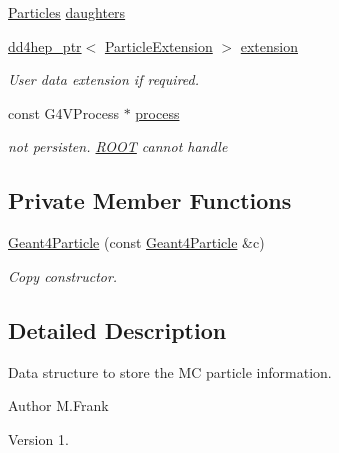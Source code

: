 \begin{DoxyCompactItemize}
\hyperlink{class_d_d4hep_1_1_simulation_1_1_geant4_particle_a123ad778eff51ea80ce778d54776c072}{Particles} \hyperlink{class_d_d4hep_1_1_simulation_1_1_geant4_particle_a2d11cd13a703d52fa61142af97e243cb}{daughters}
\item 
\hyperlink{class_d_d4hep_1_1dd4hep__ptr}{dd4hep\+\_\+ptr}$<$ \hyperlink{class_d_d4hep_1_1_simulation_1_1_particle_extension}{Particle\+Extension} $>$ \hyperlink{class_d_d4hep_1_1_simulation_1_1_geant4_particle_a07c7467088b330c17ad7f85374273470}{extension}
\begin{DoxyCompactList}\small\item\em User data extension if required. \end{DoxyCompactList}\item 
const G4\+V\+Process $\ast$ \hyperlink{class_d_d4hep_1_1_simulation_1_1_geant4_particle_abe2efb370153a1466b9fa5dd61a04f9a}{process}
\begin{DoxyCompactList}\small\item\em not persisten. \hyperlink{namespace_r_o_o_t}{R\+O\+OT} cannot handle \end{DoxyCompactList}\end{DoxyCompactItemize}
\subsection*{Private Member Functions}
\begin{DoxyCompactItemize}
\item 
\hyperlink{class_d_d4hep_1_1_simulation_1_1_geant4_particle_a4026f75168da7d38053d87a218bcada5}{Geant4\+Particle} (const \hyperlink{class_d_d4hep_1_1_simulation_1_1_geant4_particle}{Geant4\+Particle} \&c)
\begin{DoxyCompactList}\small\item\em Copy constructor. \end{DoxyCompactList}\end{DoxyCompactItemize}


\subsection{Detailed Description}
Data structure to store the MC particle information. 

\begin{DoxyAuthor}{Author}
M.\+Frank 
\end{DoxyAuthor}
\begin{DoxyVersion}{Version}
1. 
\end{DoxyVersion}


